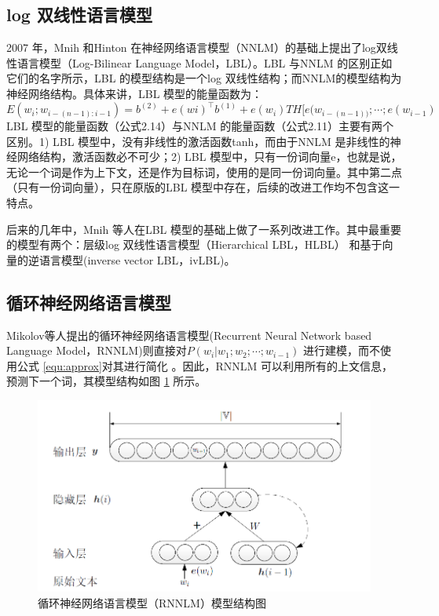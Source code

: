 \documentclass[12pt,a4paper]{article}
\begin{document}
\subsection{log 双线性语言模型}
2007 年，Mnih 和Hinton 在神经网络语言模型（NNLM）的基础上提出了log双线性语言模型（Log-Bilinear Language Model，LBL）\cite{DBLP:conf/icml/MnihH07}。LBL 与NNLM 的区别正如它们的名字所示，LBL 的模型结构是一个log 双线性结构；而NNLM的模型结构为神经网络结构。具体来讲，LBL 模型的能量函数为：
\begin{equation}
  E(w_i;w_{i-(n-1):i-1}) = b^{(2)}+ e(wi)^\top b^{(1)}+e(w_i)TH[e(w_{i-(n-1))};\cdots ; e(w_{i-1})
\end{equation}
LBL 模型的能量函数（公式2.14）与NNLM 的能量函数（公式2.11）主要有两个区别。1) LBL 模型中，没有非线性的激活函数tanh，而由于NNLM 是非线性的神经网络结构，激活函数必不可少；2) LBL 模型中，只有一份词向量e，也就是说，无论一个词是作为上下文，还是作为目标词，使用的是同一份词向量。其中第二点（只有一份词向量），只在原版的LBL 模型中存在，后续的改进工作均不包含这一特点。

后来的几年中，Mnih 等人在LBL 模型的基础上做了一系列改进工作。其中最重要的模型有两个：层级log 双线性语言模型（Hierarchical LBL，HLBL）\cite{DBLP:conf/icml/MnihT12} 和基于向量的逆语言模型(inverse vector LBL，ivLBL)\cite{DBLP:conf/nips/MnihK13}。


\subsection{循环神经网络语言模型}
Mikolov等人提出的循环神经网络语言模型(Recurrent Neural Network based Language Model，RNNLM)则直接对$P(w_i | w_1;w_2;\cdots;w_{i-1}) $ 进行建模，而不使用公式 \ref{equ:approx}对其进行简化\cite{mikolov2012statistical,DBLP:conf/interspeech/MikolovKBCK10} 。因此，RNNLM 可以利用所有的上文信息，预测下一个词，其模型结构如图 \ref{fig:rnnlm} 所示。

\begin{figure}
  \centering
  \includegraphics[width=0.85\linewidth]{./figures/rnnlm.png}
  \caption{循环神经网络语言模型（RNNLM）模型结构图}\label{fig:rnnlm}
\end{figure}
\end{document}
